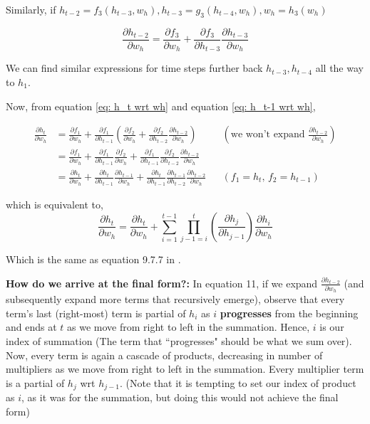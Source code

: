 \documentclass[12pt, letterpaper]{article}
\begin{document}
Similarly, if $h_{t-2} = f_3(h_{t-3}, w_h), h_{t-3}= g_3(h_{t-4}, w_h), w_h = h_3(w_h)$

\begin{equation}
    \frac{\partial h_{t-2}}{\partial w_h} = \frac{\partial f_3}{\partial w_h} + \frac{\partial f_3}{\partial h_{t-3}}\frac{\partial h_{t-3}}{\partial w_h}
    \label{eq: h_t-2 wrt wh}
\end{equation}

We can find similar expressions for time steps further back $h_{t-3}, h_{t-4}$ all the way to $h_1$.

Now, from equation \ref{eq: h_t wrt wh} and equation \ref{eq: h_t-1 wrt wh}, 

\begin{align}
    \frac{\partial h_t}{\partial w_h} &= \frac{\partial f_1}{\partial w_h} + \frac{\partial f_1}{\partial h_{t-1}}(\frac{\partial f_2}{\partial w_h} + \frac{\partial f_2}{\partial h_{t-2}}\frac{\partial h_{t-2}}{\partial w_h}) && (\text{we won't expand $\frac{\partial h_{t-2}}{\partial w_h}$}) \\
                                      &= \frac{\partial f_1}{\partial w_h} + \frac{\partial f_1}{\partial h_{t-1}}\frac{\partial f_2}{\partial w_h} + \frac{\partial f_1}{\partial h_{t-1}}\frac{\partial f_2}{\partial h_{t-2}}\frac{\partial h_{t-2}}{\partial w_h} \\
                                      &= \frac{\partial h_t}{\partial w_h} + \frac{\partial h_t}{\partial h_{t-1}}\frac{\partial h_{t-1}}{\partial w_h} + \frac{\partial h_t}{\partial h_{t-1}}\frac{\partial h_{t-1}}{\partial h_{t-2}}\frac{\partial h_{t-2}}{\partial w_h} && (\text{$f_1=h_t$, $f_2=h_{t-1}$})
\end{align}

which is equivalent to, 
\[
\boxed{\frac{\partial h_t}{\partial w_h} = \frac{\partial h_t}{\partial w_h} + \sum_{i=1}^{t-1}\prod_{j-1=i}^{t} (\frac{\partial h_j}{\partial h_{j-1}}) \frac{\partial h_i}{\partial w_h}
}
\]

Which is the same as equation 9.7.7 in \cite{d2l_bptt}.


\textbf{How do we arrive at the final form?:} In equation 11, if we expand $\frac{\partial h_{t-2}}{\partial w_h}$
(and subsequently expand more terms that recursively emerge), observe that every term's last (right-most) 
term is  partial of $h_i$ as $i$ \textbf{progresses} from the beginning and ends at $t$ as we move from right to left
in the summation. Hence, $i$ is our index of summation (The term that ``progresses" should be what we sum over).
Now, every term is again a cascade of products, decreasing in number of multipliers as we move from right to left in the summation.
Every multiplier term is a partial of $h_j$ wrt $h_{j-1}$. (Note that it is tempting to set our index of product as 
$i$, as it was for the summation, but doing this would not achieve the final form)
\end{document}
